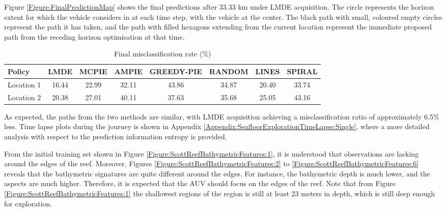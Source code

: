 			Figure \ref{Figure:FinalPredictionMap} shows the final predictions after 33.33 km under LMDE acquisition. The circle represents the horizon extent for which the vehicle considers in at each time step, with the vehicle at the center. The black path with small, coloured empty circles represent the path it has taken, and the path with filled hexagons extending from the current location represent the immediate proposed path from the receding horizon optimisation at that time.
					
			\begin{table}[t]
				{\footnotesize
				\begin{center}
					\begin{tabular}{ l c c c c c c c }
					\hline
					Policy & LMDE & MCPIE & AMPIE & GREEDY-PIE & RANDOM & LINES & SPIRAL \\
					\hline
					Location 1 & 16.44 & 22.99 & 32.11 & 43.86 & 34.87 & 20.40 & 33.74 \\
					Location 2 & 20.38 & 27.01 & 40.11 & 37.63 & 35.68 & 25.05 & 43.16 \\
					\hline
					\end{tabular}
				\end{center}
				}
		  	\caption{Final misclassification rate (\%)}
		  	\label{Table:CompareMethods}			
		  	\end{table}	
	  	
			As expected, the paths from the two methods are similar, with LMDE acquisition achieving a misclassification ratio of approximately 6.5\% less. Time lapse plots during the journey is shown in Appendix \ref{Appendix:SeafloorExplorationTimeLapse:Single}, where a more detailed analysis with respect to the prediction information entropy is provided.
			
			From the initial training set shown in Figure \ref{Figure:ScottReefBathymetricFeatures:1}, it is understood that observations are lacking around the edges of the reef. Moreover, Figures \ref{Figure:ScottReefBathymetricFeatures:2} to \ref{Figure:ScottReefBathymetricFeatures:6} reveals that the bathymetric signatures are quite different around the edges. For instance, the bathymetric depth is much lower, and the aspects are much higher. Therefore, it is expected that the AUV should focus on the edges of the reef. Note that from Figure \ref{Figure:ScottReefBathymetricFeatures:1} the shallowest regions of the region is still at least 23 meters in depth, which is still deep enough for exploration.
		
